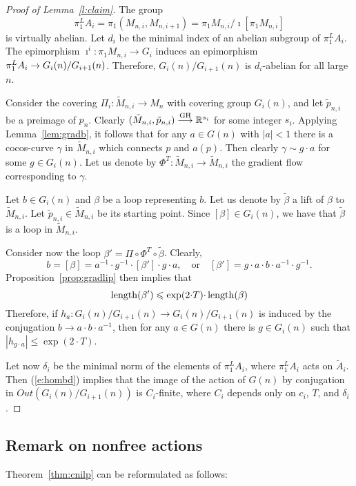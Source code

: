 \documentclass{amsart}
\begin{document}
\begin{proof} [Proof of Lemma~\ref{l:claim}]

The group
$$\pi_1^LA_i=\pi_1(M_{n,i},M_{n,i+1})=\pi_1M_{n,i}/\imath[\pi_1M_{n,i}]$$
is virtually abelian.
Let $d_i$ be the minimal index of an abelian subgroup of $\pi_1^LA_i$.
The epimorphism
$\imath^i\colon \pi_1M_{n,i}\to G_i$
induces an  epimorphism $\pi_1^LA_i\z\to G_i(n)/G_{i+1}(n)$.
Therefore, $G_i(n)/G_{i+1}(n)$ is $d_i$-abelian for all large $n$.


Consider the covering
$\Pi_i\colon \tilde M_{n,i}\to M_n$ with covering group $G_i(n)$,
and let $\tilde p_{n,i}$ be a preimage of $p_n$.
Clearly $(\tilde M_{n,i},\tilde p_{n,i})\GHto \mathbb{R}^{s_i}$
for some integer $s_i$.
Applying Lemma~\ref{lem:gradb},
it follows  that for any $a\in G(n)$ with $|a|<1$ there is
a cocos-curve $\gamma$ in $\tilde M_{n,i}$ which connects $p$ and $a(p)$.
Then clearly $\gamma\sim g{\cdot} a$ for some $g\in G_i(n)$.
Let us denote by $\Phi^T\colon  \tilde M_{n,i}\to \tilde M_{n,i}$
the gradient flow corresponding  to $\gamma$.

Let $b\in G_i(n)$ and $\beta$ be a loop  representing $b$.
Let us denote by  $\tilde\beta$ a lift of $\beta$ to $\tilde M_{n,i}$.
Let $\tilde p_{n,i}\in \tilde M_{n,i}$ be its starting point.
Since $[\beta]\in G_i(n)$,
we have that $\tilde\beta$ is a loop in $\tilde M_{n,i}$.

Consider now the loop
$\beta'=\Pi\circ\Phi^T\circ\tilde\beta$. Clearly,
$$b=[\beta]=a^{-1}{\cdot} g^{-1}{\cdot} [\beta']{\cdot} g{\cdot} a , \quad\text{or}\quad[\beta']=g{\cdot} a{\cdot} b{\cdot} a^{-1}{\cdot} g^{-1}.$$
Proposition~\ref{prop:gradlip}  then implies that
\begin{equation*}\label{e:1}\operatorname{\rm length}(\beta')\leqslant \exp(2{\cdot} T){\cdot}\operatorname{\rm length}(\beta)
\end{equation*}
Therefore, if $h_a\colon G_i(n)/G_{i+1}(n)\to G_i(n)/G_{i+1}(n)$
is induced by the conjugation $b\to a{\cdot} b{\cdot} a ^{-1}$,
then for any $a\in G(n)$ there is $g\in G_i(n)$ such that $|h_{g{\cdot} a}|\le \exp(2{\cdot} T)$.

Let now $\delta_i$ be the minimal norm of the elements of $\pi_1^LA_i$,
where $\pi_1^LA_i$ acts on $\tilde A_i$.
Then (\ref{e:hombd})  implies that the image of the
action of $G(n)$ by conjugation in $Out(G_i(n)/G_{i+1}(n))$ is $C_i$-finite,
where  $C_i$ depends only on $c_i$, $T$,
and $\delta_i$.
\end{proof}

\subsection{Remark on nonfree actions}\label{rem:nonfree}
Theorem~\ref{thm:cnilp} can be reformulated as follows:
\end{document}
